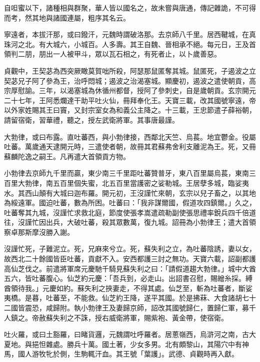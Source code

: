 \begin{pinyinscope}
 自呾蜜以下，諸種相與群聚，華人皆以國名之，故未嘗與唐通，傳記雜詭，不可得而考，然其地與諸國連屬，粗序其名云。



 寧遠者，本拔汗那，或曰鏺汗，元魏時謂破洛那。去京師八千里。居西鞬城，在真珠河之北。有大城六，小城百。人多壽。其王自魏、晉相承不絕。每元日，王及首領判二朋，朋出一人被甲斗，眾以瓦石相之，有死者止，以卜歲善惡。



 貞觀中，王契苾為西突厥瞰莫賀咄所殺，阿瑟那鼠匿奪其城。鼠匿死，子遏波之立契苾兄子阿了參為王，治呼悶城；遏波之治渴塞城。顯慶初，遏波之遣使朝貢，高宗厚慰諭。三年，以渴塞城為休循州都督，授阿了參刺史，自是歲朝貢。玄宗開元二十七年，王阿悉爛達干助平吐火仙，冊拜奉化王。天寶三載，改其國號寧遠，帝以外家姓賜其王曰竇，又封宗室女為和義公主降之。十三載，王忠節遣子薛裕朝，請留宿衛，習華禮，聽之，授左武衛將軍。其事唐最謹。



 大勃律，或曰布露。直吐蕃西，與小勃律接，西鄰北天竺、烏萇。地宜鬱金。役屬吐蕃。萬歲通天逮開元時，三遣使者朝，故冊其君蘇弗舍利支離泥為王。死，又冊蘇麟陀逸之嗣王。凡再遣大首領貢方物。



 小勃律去京師九千里而贏，東少南三千里距吐蕃贊普牙，東八百里屬烏萇，東南三百里大勃律，南五百里個失蜜，北五百里當護密之娑勒城。王居孽多城，臨娑夷水。其西山顛有大城曰迦布羅。開元初，王沒謹忙來朝，玄宗以兒子畜之，以其地為綏遠軍。國迫吐蕃，數為所困。吐蕃曰：「我非謀爾國，假道攻四鎮爾。」久之，吐蕃奪其九城，沒謹忙求救北庭，節度使張孝嵩遣疏勒副使張思禮率銳兵四千倍道往，沒謹忙因出兵，大破吐蕃，殺其眾數萬，復九城。詔冊為小勃律王；遣大首領察卓那斯摩沒勝入謝。



 沒謹忙死，子難泥立。死，兄麻來兮立。死，蘇失利之立，為吐蕃陰誘，妻以女，故西北二十餘國皆臣吐蕃，貢獻不入。安西都護三討之無功。天寶六載，詔副都護高仙芝伐之。前遣將軍席元慶馳千騎見蘇失利之曰：「請假道趨大勃律。」城中大酋五六，皆吐蕃腹心。仙芝約元慶：「吾兵到，必走山。出詔書召慰，賜繒糸採。縛酋領待我。」元慶如約。蘇失利之挾妻走，不得其處。仙芝至，斬為吐蕃者，斷娑夷橋。是暮，吐蕃至，不能救。仙芝約王降，遂平其國。於是拂菻、大食諸胡七十二國皆震恐，咸歸附。執小勃律王及妻歸京師，詔改其國號歸仁，置歸仁軍，募千人鎮之。帝赦蘇失利之不誅，授右威衛將軍，賜紫袍、黃金帶，使宿衛。



 吐火羅，或曰土豁羅，曰睹貨邏，元魏謂吐呼羅者。居蔥嶺西，烏滸河之南，古大夏地。與挹怛雜處。勝兵十萬。國土著，少女多男。北有頗黎山，其陽穴中有神馬，國人游牧牝於側，生駒輒汗血。其王號「葉護」。武德、貞觀時再入獻。




\end{pinyinscope}
